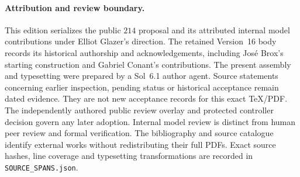 \paragraph{Attribution and review boundary.}
This edition serializes the public $214$ proposal and its attributed internal
model contributions under Elliot Glazer's direction.  The retained Version~16
body records its historical authorship and acknowledgements, including
Jos\'e Brox's starting construction and Gabriel Conant's contributions.
The present assembly and typesetting were prepared by a Sol~6.1 author agent.
Source statements concerning earlier inspection, pending status or historical
acceptance remain dated evidence.  They are not new acceptance records for
this exact TeX/PDF.  The independently authored public review overlay and
protected controller decision govern any later adoption.  Internal model
review is distinct from human peer review and formal verification.
The bibliography and source catalogue identify external works without
redistributing their full PDFs.  Exact source hashes, line coverage and
typesetting transformations are recorded in \nolinkurl{SOURCE_SPANS.json}.
